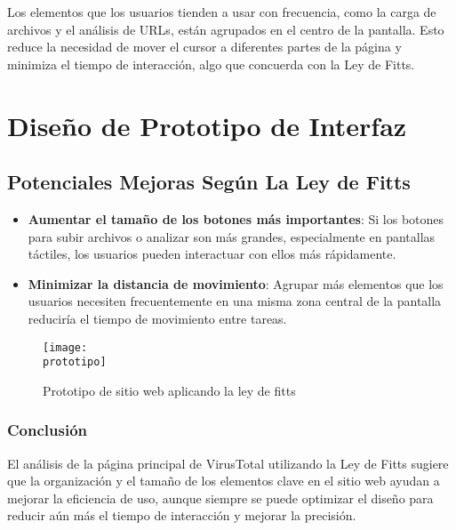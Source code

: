 	Los elementos que los usuarios tienden a usar con frecuencia, como la
	carga de archivos y el análisis de URLs, están agrupados en el
	centro de la pantalla. Esto reduce la necesidad de mover el cursor a
	diferentes partes de la página y minimiza el tiempo de interacción,
	algo que concuerda con la Ley de Fitts.

	\section{Diseño de Prototipo de Interfaz}

	\subsection{Potenciales Mejoras Según La Ley de Fitts}

	\begin{itemize}
		\item \textbf{Aumentar el tamaño de los botones más importantes}:
			Si los botones para subir archivos o analizar son más grandes,
			especialmente en pantallas táctiles, los usuarios pueden interactuar
			con ellos más rápidamente.

		\item \textbf{Minimizar la distancia de movimiento}: Agrupar más elementos
			que los usuarios necesiten frecuentemente en una misma zona central
			de la pantalla reduciría el tiempo de movimiento entre tareas.
	\end{itemize}

	\begin{figure}
		\centering
		\texttt{[image: \\prototipo]}
		\caption{Prototipo de sitio web aplicando la ley de fitts}
	\end{figure}

	\subsubsection{Conclusión}

	El análisis de la página principal de VirusTotal utilizando la Ley de
	Fitts sugiere que la organización y el tamaño de los elementos clave
	en el sitio web ayudan a mejorar la eficiencia de uso, aunque
	siempre se puede optimizar el diseño para reducir aún más el tiempo
	de interacción y mejorar la precisión.


	\nocite{*} %

	\clearpage
	

	

